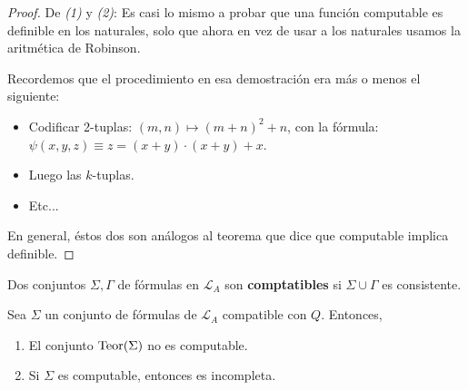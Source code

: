 \documentclass[12pt]{report}
\newcounter{it}
\theoremstyle{largebreak}
\begin{document}
    \begin{proof}
        De \textit{(1)} y \textit{(2)}: Es casi lo mismo a probar que una función computable es definible en los naturales, solo que ahora en vez de usar a los naturales usamos la aritmética de Robinson.

        Recordemos que el procedimiento en esa demostración era más o menos el siguiente:
        \begin{itemize}
            \item Codificar 2-tuplas: $(m,n)\mapsto(m+n)^2+n$, con la fórmula: $\psi(x,y,z)\equiv z=(x+y)\cdot(x+y)+x$.
            \item Luego las $k$-tuplas.
            \item Etc...
        \end{itemize}
        En general, éstos dos son análogos al teorema que dice que computable implica definible.
    \end{proof}

    \begin{mydef}
        Dos conjuntos $\Sigma,\Gamma$ de fórmulas en $\mathcal{L}_A$ son \textbf{comptatibles} si $\Sigma\cup\Gamma$ es consistente.
    \end{mydef}

    \begin{theor}
        Sea $\Sigma$ un conjunto de fórmulas de $\mathcal{L}_A$ compatible con $Q$. Entonces,
        \begin{enumerate}[label = \textit{(\arabic*)}]
            \item El conjunto $\textup{Teor}(\Sigma)$ no es computable.
            \item Si $\Sigma$ es computable, entonces es incompleta.
        \end{enumerate}
    \end{theor}
\end{document}
